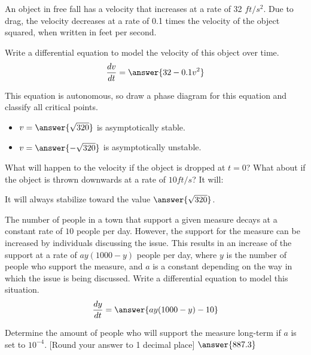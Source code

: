 \documentclass{ximera}
\begin{document}
\begin{exercise}
    An object in free fall has a velocity that increases at a rate of 32 $ft/s^2$. Due to drag, the velocity decreases at a rate of 0.1 times the velocity of the object squared, when written in feet per second. 
    
    Write a differential equation to model the velocity of this object over time.
    \[
        \frac{dv}{dt} = \answer{32-0.1v^2}
    \]
    \begin{problem}
        This equation is autonomous, so draw a phase diagram for this equation and classify all critical points.
        \begin{itemize}
            \item $v = \answer{\sqrt{320}}$ is asymptotically stable.
            \item $v = \answer{-\sqrt{320}}$ is asymptotically unstable.
        \end{itemize}
        \begin{problem}
            What will happen to the velocity if the object is dropped at $t=0$? What about if the object is thrown downwards at a rate of $10 ft/s$? It will:
            \begin{multipleChoice}
            \end{multipleChoice}
            \begin{problem}
                It will always stabilize toward the value $\answer{\sqrt{320}}$.
            \end{problem}
        \end{problem}
    \end{problem}
\end{exercise}

\begin{exercise}
    The number of people in a town that support a given measure decays at a constant rate of $10$ people per day. However, the support for the measure can be increased by individuals discussing the issue. This results in an increase of the support at a rate of $ay(1000 - y)$ people per day, where $y$ is the number of people who support the measure, and $a$ is a constant depending on the way in which the issue is being discussed. Write a differential equation to model this situation.
    \[
        \frac{dy}{dt} = \answer{ay(1000-y) - 10}
    \]
    \begin{problem}
        Determine the amount of people who will support the measure long-term if $a$ is set to $10^{-4}$. [Round your answer to 1 decimal place] $\answer{887.3}$
    \end{problem}
\end{exercise}
\end{document}
